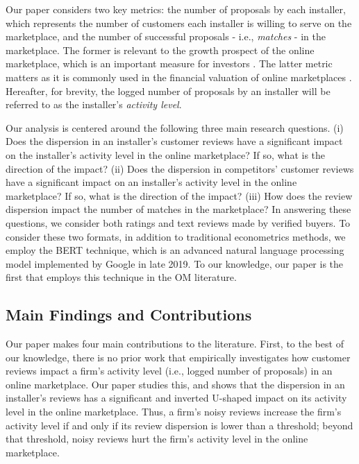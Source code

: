\documentclass[msom,blindrev]{informs3}
\begin{document}
	Our paper considers two key metrics: the number of proposals by each installer, which represents the number of customers each installer is willing to serve on the marketplace, and the number of successful proposals - i.e., \emph{matches} - in the marketplace. The former is relevant to the growth prospect of the online marketplace, which is an important measure for investors \citep{baker}.  The latter metric matters as it is commonly used in the financial valuation of online marketplaces \citep{boris_2018,galston_2017}. Hereafter, for brevity, the logged number of proposals by an installer will be referred to as the installer's \emph{activity level}.
	
	Our analysis is centered around the following three main research questions. (i) Does the dispersion in an installer's customer reviews have a significant impact on the installer's activity level in the online marketplace?  If so, what is the direction of the impact? (ii) Does the dispersion in competitors' customer reviews have a significant impact on an installer's activity level in the online marketplace? If so, what is the direction of the impact? (iii) How does the review dispersion impact the number of matches in the marketplace?  In answering these questions, we consider both  ratings and text reviews made by verified buyers. To consider these two formats, in addition to traditional econometrics methods, we employ the BERT technique, which is an advanced natural language processing model implemented by Google in late 2019. To our knowledge, our paper is the first that employs this technique in the OM literature.
	
\subsection{Main Findings and Contributions}
	
Our paper makes four main contributions to the literature. First, to the best of our knowledge, there is no prior work that empirically investigates how customer reviews impact a firm's activity level (i.e., logged number of proposals) in an online marketplace. Our paper studies this, and shows that the dispersion in an installer's reviews has a significant and inverted U-shaped impact on its activity level in the online marketplace. Thus, a firm's noisy reviews increase the firm's activity level if and only if its review dispersion is lower than a threshold; beyond that threshold, noisy reviews hurt the firm's activity level in the online marketplace.
	
\end{document}
